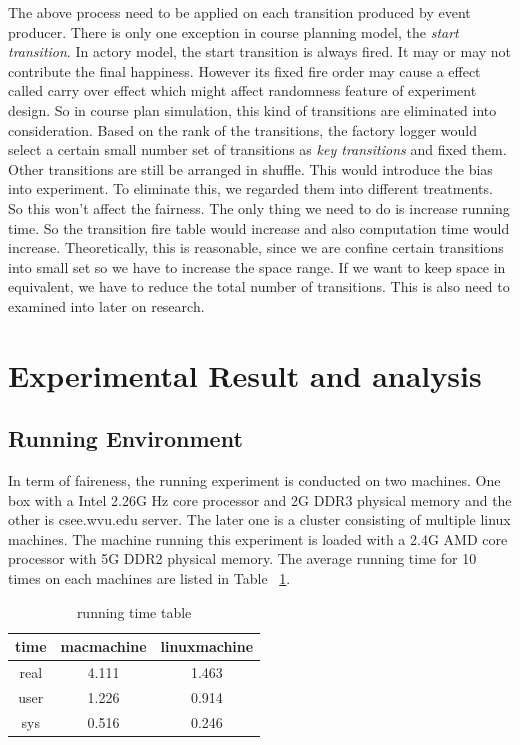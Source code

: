 \documentclass{sig-alternate}
\begin{document}
The above process need to be applied on each transition produced by event producer.   There is only one exception in course planning model, the {\em start transition}. In actory model,  the start transition is always fired.  It may or may not contribute the final happiness. However its fixed fire order may cause a effect called carry over effect \cite{} which might affect randomness feature of experiment design. So in course plan simulation, this kind of transitions are eliminated into consideration.  Based on the rank of the transitions, the factory logger would select  a certain small number set of transitions as {\em key transitions} and fixed them.  Other transitions are still be arranged in shuffle.  This would introduce the bias into experiment. To eliminate this, we regarded them into different treatments.  So this won't affect the fairness. The only thing we need to do is increase running time.  So the transition fire table would increase and also computation time would increase.  Theoretically, this is reasonable, since we are confine certain transitions into small set so we have to increase the space range.  If we want to keep space in equivalent,  we have to reduce the total number of transitions.   This is also need to examined into later on research. 
\section{Experimental Result and analysis}
\subsection{ Running Environment}
In term of faireness, the running experiment is conducted on two machines. One box with a Intel 2.26G Hz core processor and 2G DDR3 physical memory and the other is csee.wvu.edu server. The later one is a cluster consisting of multiple linux machines. The machine running this experiment is loaded with a 2.4G AMD core processor with 5G DDR2 physical memory.  
The average running time for 10 times on each machines are listed in Table ~\ref{timetable}.
\begin{table}[h]
\centering
\caption{running time table}
\label{timetable}
\begin{tabular}{|c||c|c|}
\hline
time & macmachine & linuxmachine\\
\hline
real & 4.111&1.463 \\
\hline
user&1.226&0.914\\
\hline
sys & 0.516&0.246\\
\hline
\end{tabular}
\end{table}
\end{document}
